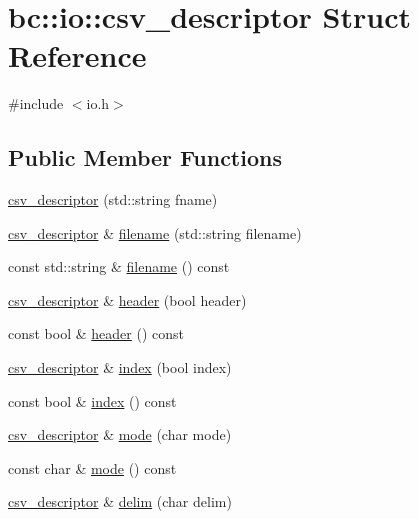 \hypertarget{structbc_1_1io_1_1csv__descriptor}{}\section{bc\+:\+:io\+:\+:csv\+\_\+descriptor Struct Reference}
\label{structbc_1_1io_1_1csv__descriptor}


{\ttfamily \#include $<$io.\+h$>$}

\subsection*{Public Member Functions}
\begin{DoxyCompactItemize}
\item 
\hyperlink{structbc_1_1io_1_1csv__descriptor_a4236072c562553bc0ea3a929794fe76e}{csv\+\_\+descriptor} (std\+::string fname)
\item 
\hyperlink{structbc_1_1io_1_1csv__descriptor}{csv\+\_\+descriptor} \& \hyperlink{structbc_1_1io_1_1csv__descriptor_a566d2a747ee455666a07bca2ee33db43}{filename} (std\+::string filename)
\item 
const std\+::string \& \hyperlink{structbc_1_1io_1_1csv__descriptor_a907ba7bab8412e3f5b92ba045cff066f}{filename} () const
\item 
\hyperlink{structbc_1_1io_1_1csv__descriptor}{csv\+\_\+descriptor} \& \hyperlink{structbc_1_1io_1_1csv__descriptor_a7828f15a2c88af2a14e63f4fa77f749a}{header} (bool header)
\item 
const bool \& \hyperlink{structbc_1_1io_1_1csv__descriptor_a1ee1515fcd0f50fded9649b6d4220012}{header} () const
\item 
\hyperlink{structbc_1_1io_1_1csv__descriptor}{csv\+\_\+descriptor} \& \hyperlink{structbc_1_1io_1_1csv__descriptor_ab2abdedbf6c131afa7e3f9baad41be4e}{index} (bool index)
\item 
const bool \& \hyperlink{structbc_1_1io_1_1csv__descriptor_a79c9769d6e81f46649984f27d163a1c6}{index} () const
\item 
\hyperlink{structbc_1_1io_1_1csv__descriptor}{csv\+\_\+descriptor} \& \hyperlink{structbc_1_1io_1_1csv__descriptor_a0a33aef278a5c4c985a7a041ceead68a}{mode} (char mode)
\item 
const char \& \hyperlink{structbc_1_1io_1_1csv__descriptor_aa094dc63b92d73c1cc25e68b42e1d06c}{mode} () const
\item 
\hyperlink{structbc_1_1io_1_1csv__descriptor}{csv\+\_\+descriptor} \& \hyperlink{structbc_1_1io_1_1csv__descriptor_a98b3bb3cf4b1370e21bea8ab13759958}{delim} (char delim)

\end{DoxyCompactItemize}

